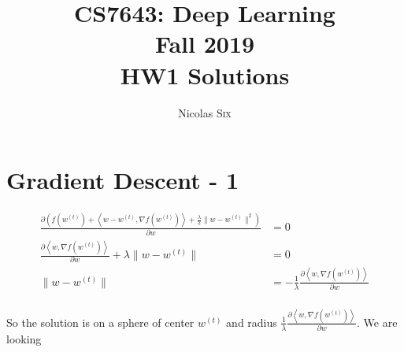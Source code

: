 \documentclass[11pt,english]{article}
\begin{document}
\title{CS7643: Deep Learning \\
Fall 2019\\ HW1 Solutions}
\author{Nicolas \textsc{Six}}
\maketitle



\section{Gradient Descent - 1}

\begin{align*}
\frac{\partial \left( f \left( w^{(t)} \right) + \left\langle w - w^{(t)} , \nabla f \left( w^{(t)} \right) \right\rangle + \frac{\lambda}{2} \| w - w^{(t)} \| ^2 \right) }{\partial w} &= 0 \\
\frac{\partial \left\langle w , \nabla f \left( w^{(t)} \right) \right\rangle  }{\partial w} + \lambda \| w - w^{(t)} \| &= 0 \\
\| w - w^{(t)} \| &= - \frac{1}{\lambda} \frac{\partial \left\langle w , \nabla f \left( w^{(t)} \right) \right\rangle  }{\partial w} \\
\end{align*}

So the solution is on a sphere of center $w^{(t)}$ and radius $\frac{1}{\lambda} \frac{\partial \left\langle w , \nabla f \left( w^{(t)} \right) \right\rangle  }{\partial w}$. We are looking 
\end{document}

